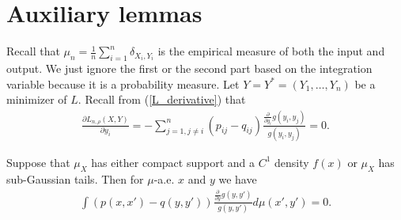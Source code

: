 \section{Auxiliary lemmas}\label{tsne:sec:extra_proofs}
Recall that $\mu_n = \frac{1}{n}\sum_{i=1}^n \delta_{X_i,Y_i}$ is the empirical
measure of both the input and output. We just ignore the first or the second
part based on the integration variable because it is a probability measure. Let
$Y = Y^* = (Y_1,\dots,Y_n)$ be a minimizer of $L$. Recall from
(\ref{L_derivative}) that
\begin{align}
    \frac{\partial L_{n, \rho}(X,Y)}{\partial y_i} = -\sum_{j=1, j \neq i}^n (p_{ij}-q_{ij}) \frac{\frac{\partial}{\partial y_i}g(y_i,y_j)}{g(y_i,y_j)} = 0.
\end{align}
\begin{lemma} \label{appendix_lemma}
    Suppose that $\mu_X$ has either compact support and a $C^1$ density $f(x)$ or $\mu_X$ has sub-Gaussian tails. Then for $\mu$-a.e. $x$ and $y$ we have
    \begin{align}
        \int (p(x,x')-q(y,y')) \frac{\frac{\partial}{\partial y}g(y,y')}{g(y,y')} d\mu(x',y') = 0.
    \end{align}
\end{lemma}
